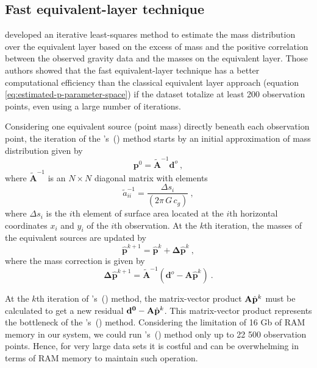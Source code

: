 \documentclass[manuscript,revised]{geophysics}
\begin{document}
\subsection{Fast equivalent-layer technique}
\citet{siqueira-etal2017} developed an iterative least-squares method to estimate the mass 
distribution over the equivalent layer based on the excess of mass and the positive correlation 
between the observed gravity data and the masses on the equivalent layer. Those authors showed 
that the fast equivalent-layer technique has a better computational efficiency than the 
classical equivalent layer approach (equation \ref{eq:estimated-p-parameter-space}) if the 
dataset totalize at least 200 observation points, even using a large number of iterations.

Considering one equivalent source (point mass) directly beneath each observation point, 
the iteration of the \citeauthor{siqueira-etal2017}'s~(\citeyear{siqueira-etal2017}) method 
starts by an initial approximation of mass distribution given by
\begin{equation}
\mathbf{p}^0 = \tilde{\mathbf{A}}^{-1} \mathbf{d}^{o} \: ,
\label{eq:p0_fast_eqlayer}
\end{equation}
where $\tilde{\mathbf{A}}^{-1}$ is an $N \times N$ diagonal matrix with elements
\begin{equation}
\tilde{a}_{ii}^{-1} = \frac{\Delta s_i}{(2 \pi \, G \, c_g)} \: ,
\label{eq:aii_tilde_inv_fast_eqlayer}
\end{equation}
where $\Delta s_i$ is the $i$th element of surface area located at the $i$th horizontal 
coordinates $x_i$ and $y_i$ of the $i$th observation.
At the $k$th iteration, the masses of the equivalent sources are updated by
\begin{equation}
\hat{\mathbf{p}}^{k+1} = \hat{\mathbf{p}}^{k} + \mathbf{\Delta} \hat{\mathbf{p}}^{k} \: ,
\label{eq:p_k+1_fast_eqlayer}
\end{equation}
where the mass correction is given by
\begin{equation}
\mathbf{\Delta} \hat{\mathbf{p}}^{k+1} = \tilde{\mathbf{A}}^{-1} (\mathbf{d}^{o} - \mathbf{A} \hat{\mathbf{p}}^{k}) \: .
\label{eq:delta_p_k_fast_eqlayer}
\end{equation}

At the $k$th iteration of \citeauthor{siqueira-etal2017}'s~(\citeyear{siqueira-etal2017}) method, 
the matrix-vector product 
$\tensor{A} \hat{\mathbf{p}}^{k}$ must be calculated to get a new residual 
$\mathbf{d^0} - \tensor{A} \hat{\mathbf{p}}^{k}$. This matrix-vector product represents the 
bottleneck of the \citeauthor{siqueira-etal2017}'s~(\citeyear{siqueira-etal2017}) method. Considering 
the limitation of 16 Gb of RAM 
memory in our system, we could run  \citeauthor{siqueira-etal2017}'s~(\citeyear{siqueira-etal2017}) method 
only up to 22 500 observation 
points. Hence, for very large data sets it is costful and can be overwhelming in terms of RAM 
memory to maintain such operation.
\end{document}
